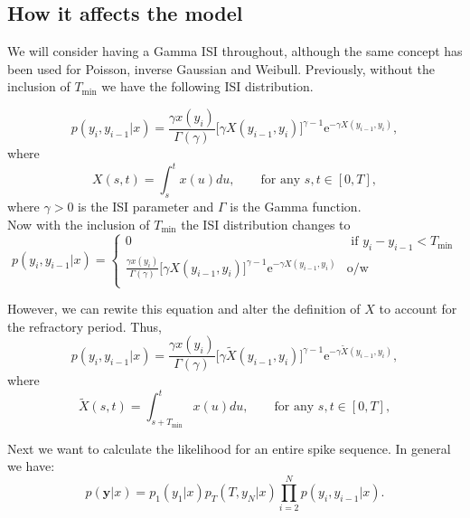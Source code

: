 \documentclass[../main.tex]{subfiles}
\begin{document}
\subsection{How it affects the model}
We will consider having a Gamma ISI throughout, although the same concept has been used for Poisson, inverse Gaussian and Weibull. Previously, without the inclusion of $T_{\mathrm{min}}$ we have the following ISI distribution.  

 \begin{equation}
p(y_i,y_{i-1}|x) = \frac{\gamma x(y_i)}{\Gamma (\gamma)} \big[ \gamma X(y_{i-1},y_i) \big]^{\gamma - 1} \mathrm{e}^{-\gamma X(y_{i-1},y_i) },
\end{equation}
 where
 \begin{equation}
X(s,t) = \int^{t}_{s} x(u) du , \qquad \text{for any } s,t \in [0,T],
\end{equation}
where $\gamma > 0 $ is the ISI parameter and $\Gamma$ is the Gamma function.\\
 
 Now with the inclusion of $T_{\mathrm{min}}$ the ISI distribution changes to 
  \begin{equation}
p(y_i,y_{i-1}|x) =
\begin{cases}
0  & \text{ if } y_i-y_{i-1}<  T_{\mathrm{min}} \\
 \frac{\gamma x(y_i)}{\Gamma (\gamma)} \big[ \gamma X(y_{i-1},y_i) \big]^{\gamma - 1} \mathrm{e}^{-\gamma X(y_{i-1},y_i) } & \text{o/w}\\
 \end{cases}
\end{equation}

However, we can rewite this equation and alter the definition of $X$ to account for the refractory period. Thus,
\begin{equation}
p(y_i,y_{i-1}|x) = \frac{\gamma x(y_i)}{\Gamma (\gamma)} \big[ \gamma \tilde X(y_{i-1},y_i) \big]^{\gamma - 1} \mathrm{e}^{-\gamma \tilde X(y_{i-1},y_i) },
\end{equation}
 where
 \begin{equation}
\tilde X(s,t) = \int^{t}_{s+T_{\mathrm{min}}} x(u) du , \qquad \text{for any } s,t \in [0,T],
\end{equation}

Next we want to calculate the likelihood for an entire spike sequence. In general we have: 
\begin{equation}
p(\mathbf{y} |x) = p_1(y_1|x) p_T(T,y_N|x) \prod^N_{i=2} p(y_i, y_{i-1}|x).
\end{equation} 
\end{document}
